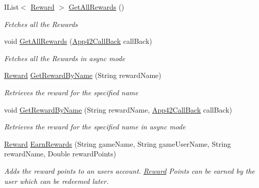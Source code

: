 \begin{DoxyCompactItemize}
I\+List$<$ \hyperlink{classcom_1_1shephertz_1_1app42_1_1paas_1_1sdk_1_1csharp_1_1reward_1_1_reward}{Reward} $>$ \hyperlink{classcom_1_1shephertz_1_1app42_1_1paas_1_1sdk_1_1csharp_1_1reward_1_1_reward_service_af9cfc59a83738e3c6b3913283ad58fe6}{Get\+All\+Rewards} ()
\begin{DoxyCompactList}\small\item\em Fetches all the Rewards \end{DoxyCompactList}\item 
void \hyperlink{classcom_1_1shephertz_1_1app42_1_1paas_1_1sdk_1_1csharp_1_1reward_1_1_reward_service_af92d906c9e7611d70021a7b873ecc3c0}{Get\+All\+Rewards} (\hyperlink{interfacecom_1_1shephertz_1_1app42_1_1paas_1_1sdk_1_1csharp_1_1_app42_call_back}{App42\+Call\+Back} call\+Back)
\begin{DoxyCompactList}\small\item\em Fetches all the Rewards in async mode \end{DoxyCompactList}\item 
\hyperlink{classcom_1_1shephertz_1_1app42_1_1paas_1_1sdk_1_1csharp_1_1reward_1_1_reward}{Reward} \hyperlink{classcom_1_1shephertz_1_1app42_1_1paas_1_1sdk_1_1csharp_1_1reward_1_1_reward_service_ada38a51d38c8f65a6c814970e70f7986}{Get\+Reward\+By\+Name} (String reward\+Name)
\begin{DoxyCompactList}\small\item\em Retrieves the reward for the specified name \end{DoxyCompactList}\item 
void \hyperlink{classcom_1_1shephertz_1_1app42_1_1paas_1_1sdk_1_1csharp_1_1reward_1_1_reward_service_a707f9d5351a1d5b7a22de4214d8dd49c}{Get\+Reward\+By\+Name} (String reward\+Name, \hyperlink{interfacecom_1_1shephertz_1_1app42_1_1paas_1_1sdk_1_1csharp_1_1_app42_call_back}{App42\+Call\+Back} call\+Back)
\begin{DoxyCompactList}\small\item\em Retrieves the reward for the specified name in async mode \end{DoxyCompactList}\item 
\hyperlink{classcom_1_1shephertz_1_1app42_1_1paas_1_1sdk_1_1csharp_1_1reward_1_1_reward}{Reward} \hyperlink{classcom_1_1shephertz_1_1app42_1_1paas_1_1sdk_1_1csharp_1_1reward_1_1_reward_service_a762563ec1d31424184737d56f7b14f90}{Earn\+Rewards} (String game\+Name, String game\+User\+Name, String reward\+Name, Double reward\+Points)
\begin{DoxyCompactList}\small\item\em Adds the reward points to an users account. \hyperlink{classcom_1_1shephertz_1_1app42_1_1paas_1_1sdk_1_1csharp_1_1reward_1_1_reward}{Reward} Points can be earned by the user which can be redeemed later. \end{DoxyCompactList}\item 

\end{DoxyCompactItemize}
